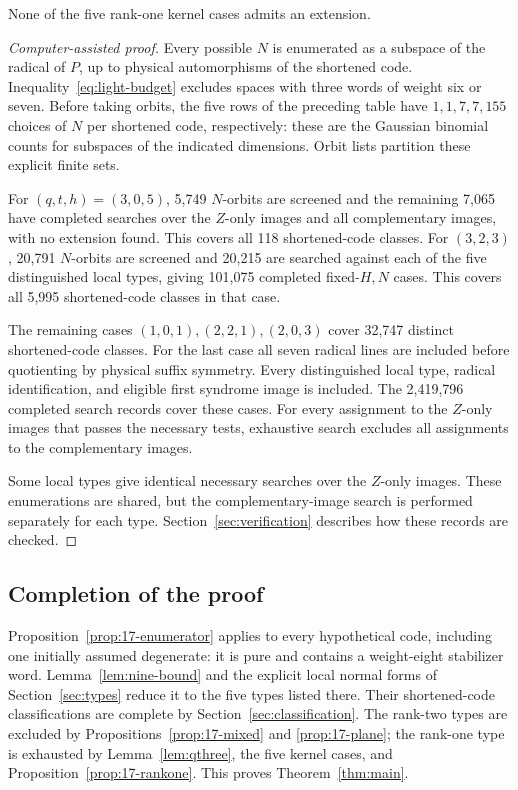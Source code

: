 \begin{proposition}\label{prop:17-rankone}
None of the five rank-one kernel cases admits an extension.
\end{proposition}
\begin{proof}[Computer-assisted proof]
Every possible \(N\) is enumerated as a subspace of the radical of
\(P\), up to physical automorphisms of the shortened code.
Inequality~\eqref{eq:light-budget} excludes spaces with three words of
weight six or seven.
Before taking orbits, the five rows of the preceding table have
\(1,1,7,7,155\) choices of \(N\) per shortened code, respectively:
these are the Gaussian binomial counts for subspaces of the indicated
dimensions. Orbit lists partition these explicit finite sets.

For \((q,t,h)=(3,0,5)\), 5,749 \(N\)-orbits are screened and the
remaining 7,065 have completed searches over the \(Z\)-only images
and all complementary images, with no extension found. This covers all 118 shortened-code classes.
For \((3,2,3)\), 20,791 \(N\)-orbits are screened and 20,215 are
searched against each of the five distinguished local types, giving
101,075 completed fixed-\(H,N\) cases. This covers all 5,995 shortened-code
classes in that case.

The remaining cases \((1,0,1),(2,2,1),(2,0,3)\) cover 32,747 distinct
shortened-code classes. For the last case all seven radical lines are included
before quotienting by physical suffix symmetry. Every distinguished local
type, radical identification, and eligible first syndrome image is included.
The 2,419,796 completed search records cover these cases. For every
assignment to the \(Z\)-only images that passes the necessary tests,
exhaustive search excludes all assignments to the complementary images.

Some local types give identical necessary searches over the \(Z\)-only
images. These enumerations are shared, but the complementary-image search
is performed separately for each type. Section~\ref{sec:verification}
describes how these records are checked.
\end{proof}

\subsection{Completion of the proof}

Proposition~\ref{prop:17-enumerator} applies to every hypothetical code,
including one initially assumed degenerate: it is pure and contains a
weight-eight stabilizer word. Lemma~\ref{lem:nine-bound}
and the explicit local normal forms of Section~\ref{sec:types} reduce
it to the five types listed there. Their shortened-code classifications
are complete by Section~\ref{sec:classification}. The rank-two types are
excluded by Propositions~\ref{prop:17-mixed} and \ref{prop:17-plane};
the rank-one type is exhausted by Lemma~\ref{lem:qthree}, the five kernel
cases, and Proposition~\ref{prop:17-rankone}.
This proves Theorem~\ref{thm:main}.
